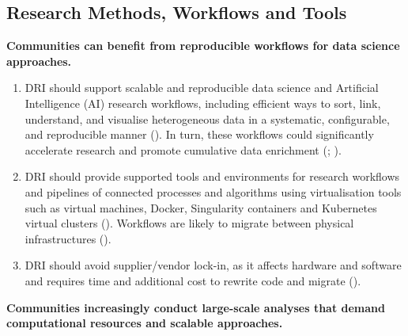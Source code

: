 \documentclass[11pt]{scrartcl}
\begin{document}
\subsection{Research Methods, Workflows and Tools}  

\noindent\textbf{Communities can benefit from reproducible workflows for data science approaches.}

\begin{enumerate}
\item\label{itm:ai} DRI should support scalable and reproducible data science and Artificial Intelligence (AI) research workflows, including efficient ways to sort, link, understand, and visualise heterogeneous data in a systematic, configurable, and reproducible manner (\cite[12]{sichani_2023_8177926}). In turn, these workflows could significantly accelerate research and promote cumulative data enrichment 
(\cite[4]{de_roure_2022_4716148}; \cite[43]{shoaib_sufi_2023_7686348}).  

\item DRI should provide supported tools and environments for research workflows and pipelines of connected processes and algorithms using virtualisation tools such as virtual machines, Docker, Singularity containers and Kubernetes virtual clusters 
(\cite[4]{de_roure_2022_4716148}). 
Workflows are likely to migrate between physical infrastructures 
(\cite[14]{collier25}).

\item DRI should avoid supplier/vendor lock-in, as it affects hardware and software and requires time and additional cost to rewrite code and migrate (\cite[3,4]{bell_2025_17099176}).  
\end{enumerate}

\noindent\textbf{Communities increasingly conduct large-scale analyses that demand computational resources and scalable approaches. }
\end{document}
